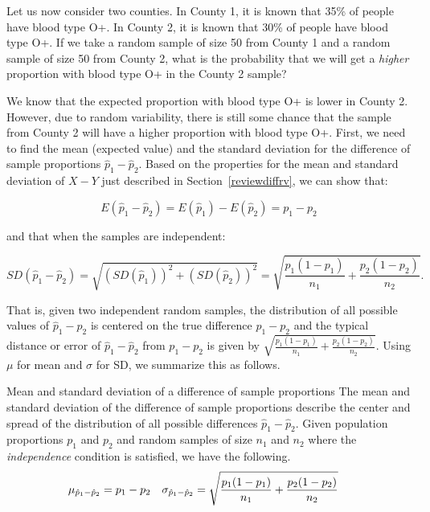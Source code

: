 Let us now consider two counties.  In County 1, it is known that 35\% of people have blood type O+.  In County 2, it is known that 30\% of people have blood type O+.  If we take a random sample of size 50 from County 1 and a random sample of size 50 from County 2, what is the probability that we will get a \emph{higher} proportion with blood type O+ in the County 2 sample?

We know that the expected proportion with blood type O+ is lower in County 2.  However, due to random variability, there is still some chance that the sample from County 2 will have a higher proportion with blood type O+.  First, we need to find the mean (expected value) and the standard deviation for the difference of sample proportions $\hat{p}_1 - \hat{p}_2$.  Based on the properties for the mean and standard deviation of $X - Y$ just described in Section~\ref{reviewdiffrv}, we can show that:

$$E(\hat{p}_1 - \hat{p}_2) = E(\hat{p}_1) - E(\hat{p}_2) = p_1 - p_2$$

\noindent and that when the samples are independent:

$$SD(\hat{p}_1 - \hat{p}_2) =  \sqrt{(SD(\hat{p}_1))^2 + (SD(\hat{p}_2))^2}=  \sqrt{\frac{p_1(1-p_1)}{n_1} + \frac{p_2(1-p_2)}{n_2}}.$$


That is, given two independent random samples, the distribution of all possible values of $\hat{p}_1 - \hat{p}_2$ is centered on the true difference $p_1-p_2$ and the typical distance or error of $\hat{p}_1 - \hat{p}_2$ from $p_1-p_2$ is given by $\sqrt{\frac{p_1(1-p_1)}{n_1} + \frac{p_2(1-p_2)}{n_2}}$.  Using $\mu$ for mean and $\sigma$ for SD, we summarize this as follows.

\begin{onebox}{Mean and standard deviation of a difference of sample proportions}
The mean and standard deviation of the difference of sample proportions describe the center and spread of the distribution of all possible differences $\hat{p}_1-\hat{p}_2$.  Given population proportions $p_1$ and $p_2$ and random samples of size $n_1$ and $n_2$ where the \emph{independence} condition is satisfied, we have the following.
\begin{align*}
\mu_{\hat{p}_1-\hat{p}_2} &= p_1-p_2
	& \sigma_{\hat{p}_1-\hat{p}_2}&=  \sqrt{\frac{p_1(1-p_1)}{n_1} + \frac{p_2(1-p_2)}{n_2}}
	\vspace{1mm}
\end{align*}\end{onebox}


